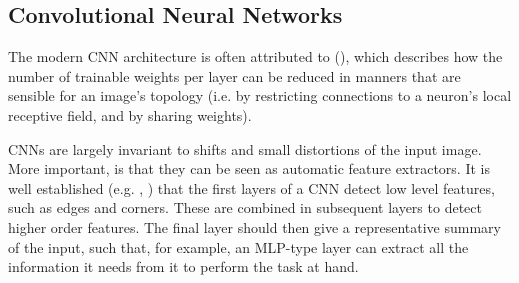 \subsection{Convolutional Neural Networks}
The modern CNN architecture is often attributed to \citeauthor{lecun1998gradient} (\citeyear{lecun1998gradient}), which describes how the number of trainable weights per layer can be reduced in manners that are sensible for an image's topology (i.e. by restricting connections to a neuron's local receptive field, and by sharing weights).


CNNs are largely invariant to shifts and small distortions of the input image. More important, is that they can be seen as automatic feature extractors. It is well established (e.g. \citeauthor{lecun1998gradient}, \citeyear{lecun1998gradient}) that the first layers of a CNN detect low level features, such as edges and corners. These are combined in subsequent layers to detect higher order features. The final layer should then give a representative summary of the input, such that, for example, an MLP-type layer can extract all the information it needs from it to perform the task at hand.



